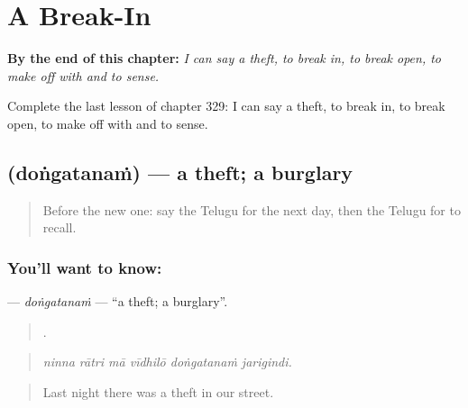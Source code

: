 
\chapter{A Break-In}
\label{ch:te-a-break-in}

\begin{chapteropening}
\textbf{By the end of this chapter:} \emph{I can say a theft, to break in, to break open, to make off with and to sense.}

Complete the last lesson of chapter 329: I can say a theft, to break in, to break open, to make off with and to sense.
\end{chapteropening}

\section[\texorpdfstring{\te{దొంగతనం} (doṅgatanaṁ)}{దొంగతనం (doṅgatanaṁ)}]{ (doṅgatanaṁ) — a theft; a burglary}

\label{lesson:TE-C329-dongatanam}



\begin{quote}
Before the new one: say the Telugu for the next day, then the Telugu for to recall.
\end{quote}

\subsection*{You'll want to know: }
\textbf{} — \emph{doṅgatanaṁ} — \textquotedblleft{}a theft; a burglary\textquotedblright{}.

\begin{quote}
     .
\end{quote}

\begin{quote}
\emph{ninna rātri mā vīdhilō doṅgatanaṁ jarigindi.}
\end{quote}

\begin{quote}
Last night there was a theft in our street.
\end{quote}

